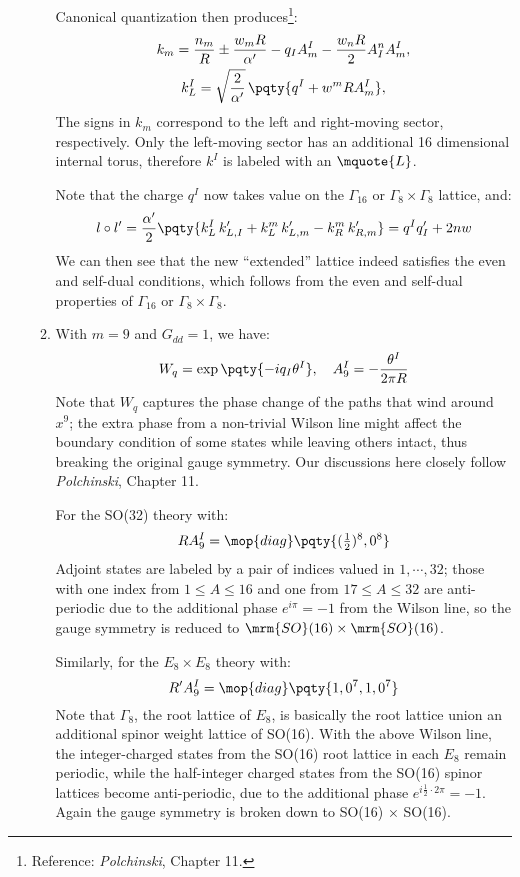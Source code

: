 \documentclass[a4paper,10pt]{article}
\begin{document}
\begin{enumerate}
\begin{enumerate}
	Canonical quantization then produces\footnote{
		Reference: \textit{Polchinski}, Chapter 11. 
	}:
	\begin{gather}
		k_m
		= \frac{n_m}{R}
			\pm \frac{w_m R}{\alpha'}
			- q_I A^I_m
			- \frac{w_n R}{2} A^n_I A_m^I,
	\\
		k^I_L
		= \sqrt{\frac{2}{\alpha'}}\,
			\pqty{
				q^I + w^m R A^I_m
			},
	\end{gather}
	The \mquote{\pm} signs in $k_m$ correspond to the left and right-moving sector, respectively. Only the left-moving sector has an additional 16 dimensional internal torus, therefore $k^I$ is labeled with an $\mquote{L}$. 
	
	Note that the charge $q^I$ now takes value on the $\Gamma_{16}$ or $\Gamma_8\times \Gamma_8$ lattice, and:
	\begin{equation}
		l\circ l'
		= \frac{\alpha'}{2} \pqty{
				k^I_L\, k'_{L,I}
				+ k^m_L\, k'_{L,m}
				- k^m_R\, k'_{R,m}
			}
		= q^I q'_I
			+ 2nw
	\end{equation}
	We can then see that the new ``extended'' lattice indeed satisfies the even and self-dual conditions, which follows from the even and self-dual properties of $\Gamma_{16}$ or $\Gamma_8\times \Gamma_8$. 
	
	\item With $m = 9$ and $G_{dd} = 1$, we have:
	\begin{equation}
		W_q = \exp \pqty{-iq_I\theta^I},
	\quad
		A^I_9 = - \frac{\theta^I}{2\pi R}
	\end{equation}
	Note that $W_q$ captures the phase change of the paths that wind around $x^9$; the extra phase from a non-trivial Wilson line might affect the boundary condition of some states while leaving others intact, thus breaking the original gauge symmetry. Our discussions here closely follow \textit{Polchinski}, Chapter 11. 
	
	For the SO(32) theory with:
	\begin{equation}
		RA^I_9
		= \mop{diag} \pqty{
				(\tfrac{1}{2})^8,
				0^8
			}
	\end{equation}
	Adjoint states are labeled by a pair of indices valued in $1,\cdots,32$; those with one index from $1 \le A \le 16$ and one from $17 \le A \le 32$ are anti-periodic due to the additional phase $e^{i\pi} = -1$ from the Wilson line, so the gauge symmetry is reduced to $\mrm{SO}(16) \times \mrm{SO}(16)$. 
	
	Similarly, for the $E_8 \times E_8$ theory with:
	\begin{equation}
		R' A^I_9
		= \mop{diag} \pqty{
				1,0^7,
				1,0^7
			}
	\end{equation}
	Note that $\Gamma_8$, the root lattice of $E_8$, is basically the root lattice union an additional spinor weight lattice of SO(16). With the above Wilson line, the integer-charged states from the SO(16) root lattice in each $E_8$ remain periodic, while the half-integer charged states from the SO(16) spinor lattices become anti-periodic, due to the additional phase $e^{i\frac{1}{2}\cdot 2\pi} = -1$. Again the gauge symmetry is broken down to SO(16) × SO(16). 
	

\end{enumerate}
\end{enumerate}
\end{document}
